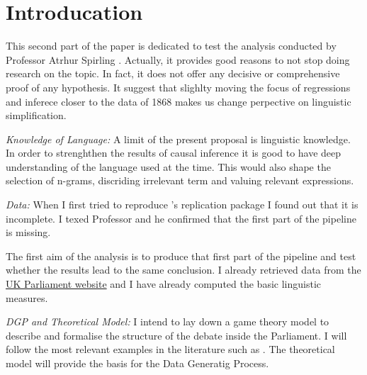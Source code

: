 
\section{Introducation} \label{sub:methodology}
This second part of the paper is dedicated to test the analysis conducted by Professor Atrhur Spirling \parencite{spirlingDemocratizationLinguisticComplexity2016}. Actually, it provides good reasons to not stop doing research on the topic. In fact, it does not offer any decisive or comprehensive proof of any hypothesis. It suggest that slighlty moving the focus of regressions and inferece closer to the data of 1868 makes us change perpective on linguistic simplification.


\vspace*{1em}
\textit{Knowledge of Language:} A limit of the present proposal is linguistic knowledge. In order to strenghthen the results of causal inference it is good to have deep understanding of the language used at the time. This would also shape the selection of n-grams, discriding irrelevant term and valuing relevant expressions. %

\vspace*{1em}
\textit{Data:} When I first tried to reproduce \textcite{spirlingDemocratizationLinguisticComplexity2016}'s replication package I found out that it is incomplete. I texed Professor \textcite{spirlingDemocratizationLinguisticComplexity2016} and he confirmed that the first part of the pipeline is missing.

The first aim of the analysis is to produce that first part of the pipeline and test whether the results lead to the same conclusion. I already retrieved data from the \href{https://hansard.parliament.uk/}{UK Parliament website} and I have already computed the basic linguistic measures.

\vspace*{1em}
\textit{DGP and Theoretical Model:} I intend to lay down a game theory model to describe and formalise the structure of the debate inside the Parliament. I will follow the most relevant examples in the literature such as \textcite{prokschPoliticsParliamentaryDebate2014, backPoliticalPartiesParliaments2016}.
The theoretical model will provide the basis for the Data Generatig Process.

